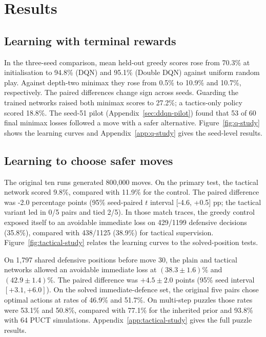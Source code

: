 \documentclass[letterpaper]{article}
\begin{document}
\section{Results}
\subsection{Learning with terminal rewards}
In the three-seed comparison, mean held-out greedy scores rose from
70.3\% at initialisation to 94.8\% (DQN) and 95.1\% (Double DQN) against
uniform random play. Against depth-two minimax they rose from 0.5\% to
10.9\% and 10.7\%, respectively. The paired differences change sign across
seeds. Guarding the trained networks raised both minimax scores to 27.2\%;
a tactics-only policy scored 18.8\%. The seed-51 pilot (Appendix~\ref{sec:ddqn-pilot})
found that 53 of 60 final minimax losses followed a move with a safer alternative.
Figure~\ref{fig:q-study} shows the learning curves and Appendix~\ref{app:q-study} gives the seed-level results.

\subsection{Learning to choose safer moves}
\label{sec:tactical-study}
The original ten runs generated 800{,}000 moves. On the primary test, the tactical network scored 9.8\%, compared with 11.9\% for the control. The paired difference was -2.0 percentage points (95\% seed-paired $t$ interval [-4.6, +0.5] pp; the tactical variant led in 0/5 pairs and tied 2/5). In those match traces, the greedy control exposed itself to an avoidable immediate loss on 429/1199 defensive decisions (35.8\%), compared with 438/1125 (38.9\%) for tactical supervision. Figure~\ref{fig:tactical-study} relates the learning curves to the solved-position tests.

On 1,797 shared defensive positions before move 30,
the plain and tactical networks allowed an avoidable immediate loss at
$(38.3\pm1.6)\%$ and $(42.9\pm1.4)\%$. The paired difference
was $+4.5\pm2.0$ points (95\% seed interval
$[+3.1,+6.0]$). On the solved immediate-defence set, the
original five pairs chose optimal actions at rates of 46.9\% and 51.7\%.
On multi-step puzzles those rates were 53.1\% and 50.8\%, compared with
77.1\% for the inherited prior and 93.8\% with 64 PUCT simulations.
Appendix~\ref{app:tactical-study} gives the full puzzle results.
\end{document}
